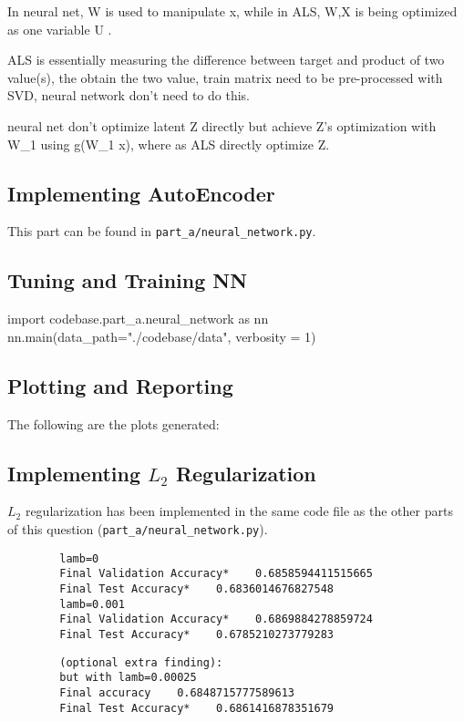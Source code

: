 \documentclass{article}
\begin{document}
    In neural net, W is used to manipulate x, while in ALS, W,X is being optimized as one variable U .

    ALS is essentially measuring the difference between target and product of two value(s), the obtain the two value, train matrix need to be pre-processed with SVD, neural network don't need to do this.

    neural net don't optimize latent Z directly but achieve Z's optimization with W_1 using g(W_1 x), where as ALS directly optimize Z.


    \subsection{Implementing AutoEncoder}
    This part can be found in \verb|part_a/neural_network.py|.

    \subsection{Tuning and Training NN}
    \begin{pylabblock}[NN]
        import codebase.part_a.neural_network as nn
        nn.main(data_path="./codebase/data", verbosity = 1)
    \end{pylabblock}
    \printpythontex[verb]

    \subsection{Plotting and Reporting}
    The following are the plots generated:

    
    \subsection{Implementing $L_2$ Regularization}
    $L_2$ regularization has been implemented in the same code file as the other parts of this question (\verb|part_a/neural_network.py|).

    \begin{verbatim}
        lamb=0
        Final Validation Accuracy*    0.6858594411515665
        Final Test Accuracy*    0.6836014676827548
        lamb=0.001
        Final Validation Accuracy*    0.6869884278859724
        Final Test Accuracy*    0.6785210273779283
    \end{verbatim}

    \begin{verbatim}
        (optional extra finding):
        but with lamb=0.00025
        Final accuracy    0.6848715777589613
        Final Test Accuracy*    0.6861416878351679
    \end{verbatim}
\end{document}

